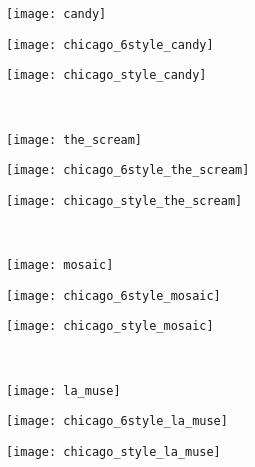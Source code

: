 \begin{figure}
	\vspace{-0.7cm}
	\centering
	\begin{subfigure}[t]{0.1\textwidth}
		\vskip 0pt
		\texttt{[image: candy]}
	\end{subfigure}
	\begin{subfigure}[t]{0.4\textwidth}
		\vskip 0pt
		\texttt{[image: chicago\_6style\_candy]}
	\end{subfigure}
	\begin{subfigure}[t]{0.4\textwidth}
		\vskip 0pt
		\texttt{[image: chicago\_style\_candy]}
	\end{subfigure}\\
	\begin{subfigure}[t]{0.1\textwidth}
		\vskip 0pt
		\texttt{[image: the\_scream]}
	\end{subfigure}
	\begin{subfigure}[t]{0.4\textwidth}
		\vskip 0pt
		\texttt{[image: chicago\_6style\_the\_scream]}
	\end{subfigure}
	\begin{subfigure}[t]{0.4\textwidth}
		\vskip 0pt
		\texttt{[image: chicago\_style\_the\_scream]}
	\end{subfigure}\\
	\begin{subfigure}[t]{0.1\textwidth}
		\vskip 0pt
		\texttt{[image: mosaic]}
	\end{subfigure}
	\begin{subfigure}[t]{0.4\textwidth}
		\vskip 0pt
		\texttt{[image: chicago\_6style\_mosaic]}
	\end{subfigure}
	\begin{subfigure}[t]{0.4\textwidth}
		\vskip 0pt
		\texttt{[image: chicago\_style\_mosaic]}
	\end{subfigure}\\
	\begin{subfigure}[t]{0.1\textwidth}
		\vskip 0pt
		\texttt{[image: la\_muse]}
	\end{subfigure}
	\begin{subfigure}[t]{0.4\textwidth}
		\vskip 0pt
		\texttt{[image: chicago\_6style\_la\_muse]}
	\end{subfigure}
	\begin{subfigure}[t]{0.4\textwidth}
		\vskip 0pt
		\texttt{[image: chicago\_style\_la\_muse]}

\end{subfigure}
\end{figure}
